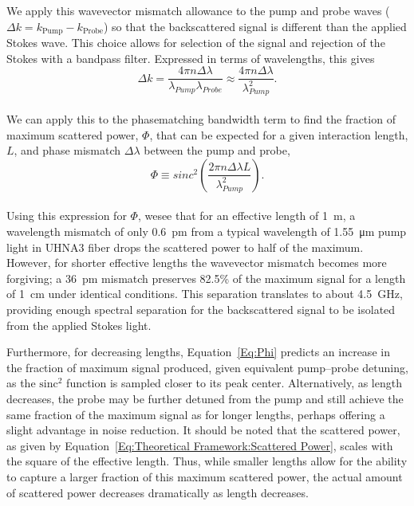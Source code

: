 We apply this wavevector mismatch allowance to the pump and probe waves (\(\Delta k = k_{\mathrm{Pump}} - k_{\mathrm{Probe}}\)) so that the backscattered signal is different than the applied Stokes wave. This choice allows for selection of the signal and rejection of the Stokes with a bandpass filter. Expressed in terms of wavelengths, this gives
\\
\begin{equation}
  \Delta k = \frac{4\pi n\Delta\lambda}{\lambda_{Pump}\lambda_{Probe}} \approx \frac{4\pi n\Delta\lambda}{\lambda_{Pump}^{2}}.
\end{equation}
\\
We can apply this to the phasematching bandwidth term to find the fraction of maximum scattered power, \(\Phi\), that can be expected for a given interaction length, \(L\), and phase mismatch \(\Delta\lambda\) between the pump and probe,
\\
\begin{equation}
  \Phi \equiv sinc^{2}\left(\frac{2\pi n\Delta\lambda L}{\lambda_{Pump}^{2}}\right).
  \label{Eq:Phi}
\end{equation}
\\
Using this expression for \(\Phi\), wesee that for an effective length of \SI{1}{\meter}, a wavelength mismatch of only \SI{0.6}{\pico\meter} from a typical wavelength of \SI{1.55}{\micro\meter} pump light in \ac{UHNA3} fiber drops the scattered power to half of the maximum. However, for shorter effective lengths the wavevector mismatch becomes more forgiving; a \SI{36}{\pico\meter} mismatch preserves 82.5\% of the maximum signal for a length of \SI{1}{\centi\meter} under identical conditions. This separation translates to about \SI{4.5}{\giga\hertz}, providing enough spectral separation for the backscattered signal to be isolated from the applied Stokes light.

Furthermore, for decreasing lengths, Equation~\ref{Eq:Phi} predicts an increase in the fraction of maximum signal produced, given equivalent pump--probe detuning, as the \(\mathrm{sinc^2}\) function is sampled closer to its peak center. Alternatively, as length decreases, the probe may be further detuned from the pump and still achieve the same fraction of the maximum signal as for longer lengths, perhaps offering a slight advantage in noise reduction. It should be noted that the scattered power, as given by Equation~\ref{Eq:Theoretical Framework:Scattered Power}, scales with the square of the effective length. Thus, while smaller lengths allow for the ability to capture a larger fraction of this maximum scattered power, the actual amount of scattered power decreases dramatically as length decreases.

